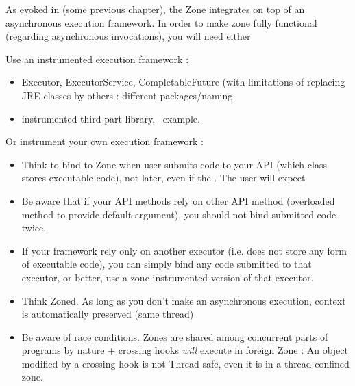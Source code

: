 As evoked in (some previous chapter), the Zone integrates on top of an asynchronous execution framework. In order to make zone fully functional (regarding asynchronous invocations), you will need either

Use an instrumented execution framework :
\begin{itemize}
\item Executor, ExecutorService, CompletableFuture (with limitations of replacing JRE classes by others : different packages/naming
\item instrumented third part library, \vertx\ example.
\end{itemize}

Or instrument your own execution framework :
\begin{itemize}
\item Think to bind to Zone when user submits code to your API (which class stores executable code), not later, even if the . The user will expect
\item Be aware that if your API methods rely on other API method (overloaded method to provide default argument), you should not bind submitted code twice.
\item If your framework rely only on another executor (i.e. does not store any form of executable code), you can simply bind any code submitted to that executor, or better, use a zone-instrumented version of that executor.
\item Think Zoned. As long as you don't make an asynchronous execution, context is automatically preserved (same thread)
\item Be aware of race conditions. Zones are shared among concurrent parts of programs by nature + crossing hooks \emph{will} execute in foreign Zone : An object modified by a crossing hook is not Thread safe, even it is in a thread confined zone.
\end{itemize}